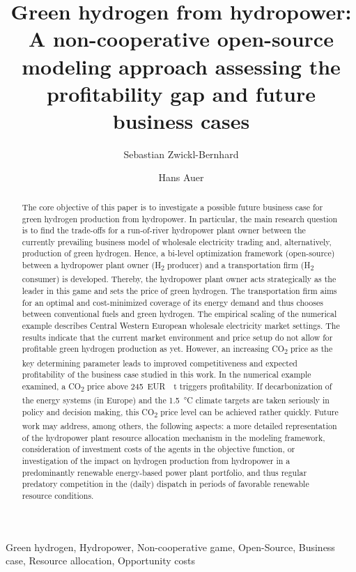 \documentclass[review]{elsarticle}
\begin{document}
\begin{frontmatter}

\title{Green hydrogen from hydropower: A non-cooperative open-source modeling approach assessing the profitability gap and future business cases}
\author[1]{Sebastian Zwickl-Bernhard}
\author[1]{Hans Auer}
\address[1]{Energy Economics Group (EEG), Technische Universität Wien, Gusshausstrasse 25-29/E370-3, 1040 Wien, Austria}


\begin{abstract}
The core objective of this paper is to investigate a possible future business case for green hydrogen production from hydropower. In particular, the main research question is to find the trade-offs for a run-of-river hydropower plant owner between the currently prevailing business model of wholesale electricity trading and, alternatively, production of green hydrogen. Hence, a bi-level optimization framework (open-source) between a hydropower plant owner (H\textsubscript{2} producer) and a transportation firm (H\textsubscript{2} consumer) is developed. Thereby, the hydropower plant owner acts strategically as the leader in this game and sets the price of green hydrogen. The transportation firm aims for an optimal and cost-minimized coverage of its energy demand and thus chooses between conventional fuels and green hydrogen. The empirical scaling of the numerical example describes Central Western European wholesale electricity market settings. The results indicate that the current market environment and price setup do not allow for profitable green hydrogen production as yet. However, an increasing CO\textsubscript{2} price as the key determining parameter leads to improved competitiveness and expected profitability of the business case studied in this work. In the numerical example examined, a CO\textsubscript{2} price above \SI{245}{EUR \per \tonne} triggers profitability. If decarbonization of the energy systems (in Europe) and the \SI{1.5}{\degreeCelsius} climate targets are taken seriously in policy and decision making, this CO\textsubscript{2} price level can be achieved rather quickly. Future work may address, among others, the following aspects: a more detailed representation of the hydropower plant resource allocation mechanism in the modeling framework, consideration of investment costs of the agents in the objective function, or investigation of the impact on hydrogen production from hydropower in a predominantly renewable energy-based power plant portfolio, and thus regular predatory competition in the (daily) dispatch in periods of favorable renewable resource conditions. 
\end{abstract}


\begin{keyword}
Green hydrogen, Hydropower, Non-cooperative game, Open-Source, Business case, Resource allocation, Opportunity costs
\end{keyword}

\end{frontmatter}
\end{document}
